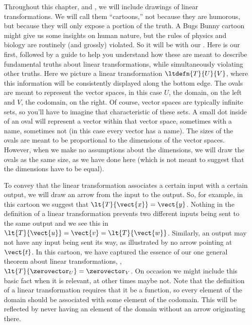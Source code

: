 %
%
Throughout this chapter, and , we will include drawings of linear transformations.  We will call them ``cartoons,'' not because they are humorous, but because they will only expose a portion of the truth.  A Bugs Bunny cartoon might give us some insights on human nature, but the rules of physics and biology are routinely (and grossly) violated.  So it will be with our .  Here is our first, followed by a guide to help you understand how these are meant to describe fundamental truths about linear transformations, while simultaneously violating other truths.
%
%
Here we picture a linear transformation $\ltdefn{T}{U}{V}$, where this information will be consistently displayed along the bottom edge.  The ovals are meant to represent the vector spaces, in this case $U$, the domain, on the left and $V$, the codomain, on the right.  Of course, vector spaces are typically infinite sets, so you'll have to imagine that characteristic of these sets.  A small dot inside of an oval will represent a vector within that vector space, sometimes with a name, sometimes not (in this case every vector has a name).  The sizes of the ovals are meant to be proportional to the dimensions of the vector spaces.  However, when we make no assumptions about the dimensions, we will draw the ovals as the same size, as we have done here (which is not meant to suggest that the dimensions have to be equal).\par
%
To convey that the linear transformation associates a certain input with a certain output, we will draw an arrow from the input to the output.  So, for example, in this cartoon we suggest that $\lt{T}{\vect{x}}=\vect{y}$.  Nothing in the definition of a linear transformation prevents two different inputs being sent to the same output and we see this in $\lt{T}{\vect{u}}=\vect{v}=\lt{T}{\vect{w}}$.  Similarly, an output may not have any input being sent its way, as illustrated by no arrow pointing at $\vect{t}$.  In this cartoon, we have captured the essence of our one general theorem about linear transformations, , $\lt{T}{\zerovector_U}=\zerovector_V$.  On occasion we might include this basic fact when it is relevant, at other times maybe not.  Note that the definition of a linear transformation requires that it be a function, so every element of the domain should be associated with some element of the codomain.  This will be reflected by never having an element of the domain without an arrow originating there.\par
